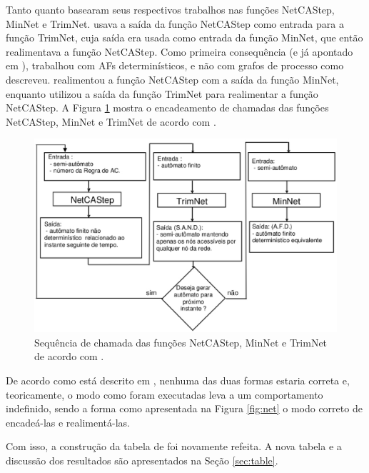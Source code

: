 \documentclass[12pt,a4paper]{article}
\begin{document}
Tanto  quanto  basearam seus
respectivos trabalhos nas funções NetCAStep, MinNet e TrimNet.
 usava a saída da função NetCAStep como entrada
para a função TrimNet, cuja saída era usada como entrada da função
MinNet, que então realimentava a função NetCAStep. Como primeira
consequência (e já apontado em ),
 trabalhou com AFs determinísticos, e não com
grafos de processo como descreveu.  realimentou
a função NetCAStep com a saída da função MinNet, enquanto
 utilizou a saída da função TrimNet para realimentar
a função NetCAStep. A Figura \ref{fig:net-miki} mostra o encadeamento de
chamadas das funções NetCAStep, MinNet e TrimNet de acordo com
.

\begin{figure}[htp]
\begin{center}
\includegraphics[scale=0.5]{img/net-miki.eps}
\caption{Sequência de chamada das funções NetCAStep, MinNet e TrimNet de
acordo com .}
\label{fig:net-miki}
\end{center}
\end{figure}

De acordo como está descrito em
, nenhuma das duas formas estaria correta e,
teoricamente, o modo como foram executadas leva a um comportamento indefinido,
sendo a forma como apresentada na Figura \ref{fig:net} o modo correto de
encadeá-las e realimentá-las.

Com isso, a construção da tabela de  foi novamente
refeita. A nova tabela e a discussão dos resultados são apresentados na
Seção \ref{sec:table}.
\end{document}
